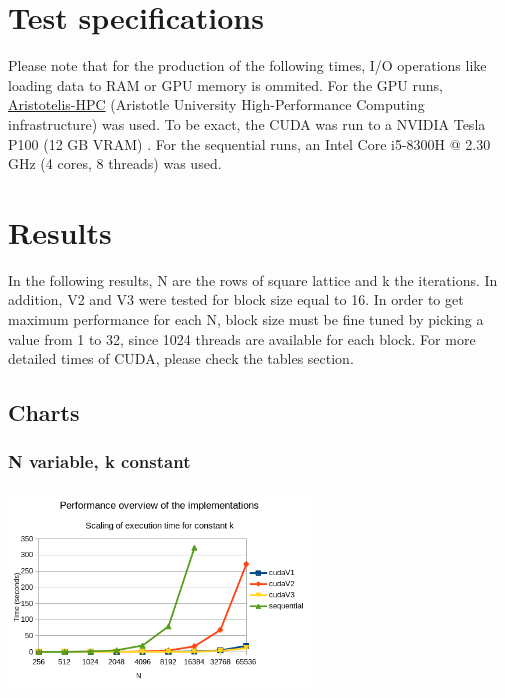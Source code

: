 \documentclass[11pt]{article}
\begin{document}
\section{Test specifications}
\label{sec:org7c5b44c}
Please note that for the production of the following times, I/O operations like loading data to RAM or GPU memory is ommited. For the GPU runs, \href{https://hpc.it.auth.gr/}{Aristotelis-HPC} (Aristotle University High-Performance Computing infrastructure) was used. To be exact, the CUDA was run to a NVIDIA Tesla P100 (12 GB VRAM) \autocite{hpc-resources}. For the sequential runs, an Intel Core i5-8300H @ 2.30 GHz (4 cores, 8 threads) was used.
\section{Results}
\label{sec:org9fb9f34}
In the following results, N are the rows of square lattice and k the iterations. In addition, V2 and V3 were tested for block size equal to 16. In order to get maximum performance for each N, block size must be fine tuned by picking a value from 1 to 32, since 1024 threads are available for each block. For more detailed times of CUDA, please check the tables section.
\pagebreak
\subsection{Charts}
\label{sec:orgabf5a01}
\subsubsection{N variable, k constant}
\label{sec:org03b3047}
\begin{center}
\includegraphics[height=200]{./images/performance-overview.png}
\end{center}
\end{document}
